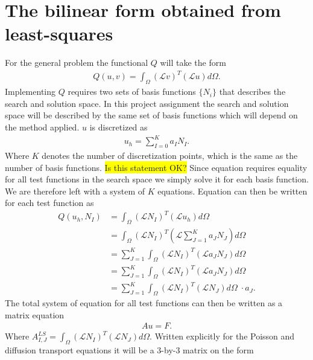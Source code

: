 \section{The bilinear form obtained from least-squares}
 For the general problem the functional $Q$ will take the form 
\begin{align}
	Q(u,v)=\int_{\Omega}(\mathcal{L}v)^T(\mathcal{L}u)d\Omega.
	\label{eq:functionalInt}
\end{align}
Implementing $Q$ requires two sets of basis functions $\{N_i\}$ that describes the search and solution space. In this project assignment the search and solution space will be described by the same set of basis functions which will depend on the method applied. $u$ is discretized as 
\begin{align}
	u_h = \sum_{I=0}^{K}a_IN_I.
	\label{eq:uDisc}
\end{align}
Where $K$ denotes the number of discretization points, which is the same as the number of basis functions. \colorbox{yellow}{Is this statement OK?} Since equation requires equality for all test functions in the search space we simply solve it for each basis function. We are therefore left with a system of $K$ equations. Equation can then be written for each test function as  
\begin{align}
	Q(u_h,N_I) &= \int_{\Omega}(\mathcal{L}N_I)^T(\mathcal{L}u_h)d\Omega \\
	&= \int_{\Omega}(\mathcal{L}N_I)^T(\mathcal{L}\sum_{J=1}^Ka_JN_J)d\Omega \\
	&= \sum_{J=1}^K\int_{\Omega}(\mathcal{L}N_I)^T(\mathcal{L}a_JN_J)d\Omega \\
	&= \sum_{J=1}^K\int_{\Omega}(\mathcal{L}N_I)^T(\mathcal{L}a_JN_J)d\Omega \\
	&= \sum_{J=1}^K\int_{\Omega}(\mathcal{L}N_I)^T(\mathcal{L}N_J)d\Omega \;\cdot a_J.
	\label{eq:varFormDisc}
\end{align}
The total system of equation for all test functions can then be written as a matrix equation 
\begin{align}
	Au = F.
	\label{eq:matrixEq}
\end{align}
Where $A^{LS}_{I,J}=\int_{\Omega}(\mathcal{L}N_I)^T(\mathcal{L}N_J)d\Omega$. Written explicitly for the Poisson and diffusion transport equations it will be a 3-by-3 matrix on the form 

